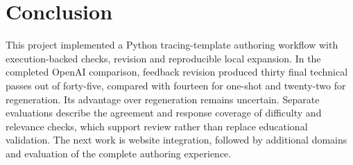 \section{Conclusion}\label{sec:conclusion}

This project implemented a Python tracing-template authoring workflow with execution-backed checks, revision and reproducible local expansion. In the completed OpenAI comparison, feedback revision produced thirty final technical passes out of forty-five, compared with fourteen for one-shot and twenty-two for regeneration. Its advantage over regeneration remains uncertain. Separate evaluations describe the agreement and response coverage of difficulty and relevance checks, which support review rather than replace educational validation. The next work is website integration, followed by additional domains and evaluation of the complete authoring experience.
